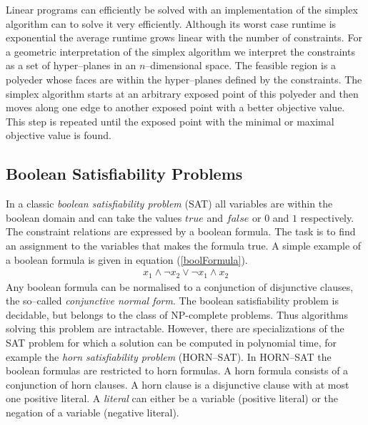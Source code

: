 Linear programs can efficiently be solved with an implementation of the simplex algorithm \cite{dantzig63Simplex} can to solve it very efficiently. Although its worst case runtime is exponential the average runtime grows linear with the number of constraints. For a geometric interpretation of the simplex algorithm we interpret the constraints as a set of hyper--planes in an $n$--dimensional space. The feasible region is a polyeder whose faces are within the hyper--planes defined by the constraints. The simplex algorithm starts at an arbitrary exposed point of this polyeder and then moves along one edge to another exposed point with a better objective value. This step is repeated until the exposed point with the minimal or maximal objective value is found.
\subsection{Boolean Satisfiability Problems}
\label{sec:MathBooleanSat}
In a classic \emph{boolean satisfiability problem} (SAT) all variables are within the boolean domain and can take the values $true$ and $false$ or $0$ and $1$ respectively. The constraint relations are expressed by a boolean formula. The task is to find an assignment to the variables that makes the formula true. A simple example of a boolean formula is given in equation (\ref{boolFormula}).
\begin{eqnarray}
x_1 \land \neg x_2  \lor \neg x_1 \land {x_2}
\label{boolFormula}
\end{eqnarray}
Any boolean formula can be normalised to a conjunction of disjunctive clauses, the so--called \emph{conjunctive normal form}. The boolean satisfiability problem is decidable, but belongs to the class of NP-complete problems. Thus algorithms solving this problem are intractable. However, there are specializations of the SAT problem for which a solution can be computed in polynomial time, for example the \emph{horn satisfiability problem} (HORN--SAT). In HORN--SAT the boolean formulas are restricted to horn formulas. A horn formula consists of a conjunction of horn clauses. A horn clause is a disjunctive clause with at most one positive literal. A \emph{literal} can either be a variable (positive literal) or the negation of a variable (negative literal).\\
